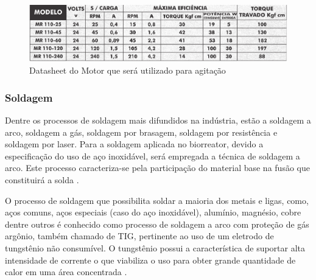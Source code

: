 \begin{figure}[H]
	\centering
  \includegraphics[keepaspectratio=true,scale=0.5]{figuras/data.eps}
  \caption{Datasheet do Motor que será utilizado para agitação}
  \label{data}
\end{figure}

\subsubsection{Soldagem}

Dentre os processos de soldagem mais difundidos na indústria, estão a soldagem a arco, soldagem a gás, soldagem por brasagem, soldagem por resistência e soldagem por laser. Para a soldagem aplicada no biorreator, devido a especificação do uso de aço inoxidável, será empregada a técnica de soldagem a arco. Este processo caracteriza-se pela participação do material base na fusão que constituirá a solda \cite{chiaverini1986tecnologia}.

O processo de soldagem que possibilita soldar a maioria dos metais e ligas, como, aços comuns, aços especiais (caso do aço inoxidável), alumínio, magnésio, cobre dentre outros é conhecido como processo de soldagem a arco com proteção de gás argônio, também chamado de TIG, pertinente ao uso de um eletrodo de tungstênio não consumível. O tungstênio possui a característica de suportar alta intensidade de corrente o que viabiliza o uso para obter grande quantidade de calor em uma área concentrada \cite{chiaverini1986tecnologia}.


